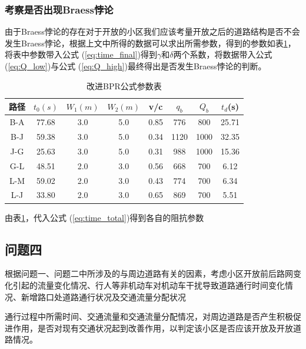 \documentclass[fontset=windows,a4paper,12pt]{ctexart}
\renewcommand{\eqref}[1]{公式 (\ref{#1})}
\begin{document}
		\subsubsection{考察是否出现Braess悖论}
			由于Braess悖论的存在对于开放的小区我们应该考量开放之后的道路结构是否不会发生Braess悖论，根据上文中所得的数据可以求出所需参数，得到的参数如表\ref{tab:braess_args}，将表中参数带入\eqref{eq:time_final}得到$\gamma$和$\delta$两个系数，将数据带入\eqref{eq:Q_low}与\eqref{eq:Q_high}最终得出是否发生Braess悖论的判断。
			\begin{table}[!htbp]
				\centering
				\caption{改进BPR公式参数表}
				\label{tab:braess_args}
				\begin{tabular}{c|ccccccc}
					\toprule[1pt] 
					路径&	$t_0(s)$&	$W_1(m)$&	$W_2(m)$&	v/c&	$q_b$& $Q_b$&	$t_d$(s)\\
					\hline
					B-A& 77.68& 3.0& 5.0& 0.85& 776&800&25.71\\
					B-J& 59.38& 3.0& 5.0& 0.34& 1120&1000&32.35\\
					J-G& 25.63&	3.0& 5.0& 0.31& 988& 1000&15.36\\
					G-L& 48.51& 2.0& 3.0& 0.56& 668& 700&6.12\\
					L-M& 59.02& 2.0& 3.0& 0.43& 774& 700&6.34\\
					L-J& 33.80& 2.0& 3.0& 0.65& 869& 700&5.51\\
					\bottomrule[1pt]
				\end{tabular} 
			\end{table}
			由表\ref{tab:braess_args}，代入\eqref{eq:time_total}得到各自的阻抗参数
	\subsection{问题四}
		  根据问题一、问题二中所涉及的与周边道路有关的因素，考虑小区开放前后路网变化引起的流量变化情况、行人等非机动车对机动车干扰导致道路通行时间变化情况、新增路口处道路通行状况及交通流量分配状况

		通行过程中所需时间、交通流量和交通流量分配情况，对周边道路是否产生积极促进作用，是否对现有交通状况起到改善作用，以判定该小区是否应该开放及开放道路情况。
		
\end{document}
